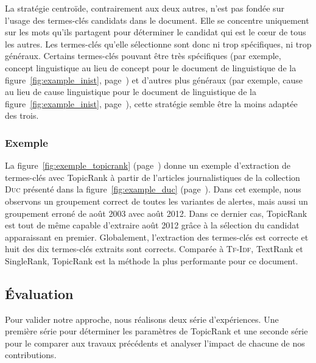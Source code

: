         La stratégie centroïde, contrairement aux deux autres, n'est pas fondée
        sur l'usage des termes-clés candidats dans le document. Elle se
        concentre uniquement sur les mots qu'ils partagent pour déterminer le
        candidat qui est le c\oe{}ur de tous les autres. Les termes-clés qu'elle
        sélectionne sont donc ni trop spécifiques, ni trop généraux. Certains
        termes-clés pouvant être très spécifiques (par exemple, \og{}concept
        linguistique\fg{} au lieu de \og{}concept\fg{} pour le document de
        linguistique de la figure~\ref{fig:example_inist},
        page~\pageref{fig:example_inist}) et d'autres plus généraux (par
        exemple, \og{}cause\fg{} au lieu de \og{}cause linguistique\fg{} pour le
        document de linguistique de la figure~\ref{fig:example_inist},
        page~\pageref{fig:example_inist}), cette stratégie semble être la moins
        adaptée des trois.

      \subsubsection{Exemple}
      \label{subsubsec:main:domain_independent_keyphrase_extraction-unsupervised_automatic_keyphrase_extraction-topicrank-example}
        La figure~\ref{fig:exemple_topicrank}
        (page~\pageref{fig:exemple_topicrank}) donne un exemple d'extraction de
        termes-clés avec TopicRank à partir de l'articles journalistiques
        de la collection \textsc{Duc} présenté dans la figure~\ref{fig:example_duc}
        (page~\pageref{fig:example_duc}). Dans cet exemple,
        nous observons un groupement correct de toutes les variantes de
        \og{}aler\-tes\fg{}, mais aussi un groupement erroné de \og{}août 2003\fg{} avec
        \og{}août 2012\fg{}. Dans ce dernier cas, TopicRank est tout de même
        capable d'extraire \og{}août 2012\fg{} grâce à la sélection du candidat
        apparaissant en premier. Globalement, l'extraction des termes-clés est
        correcte et huit des dix termes-clés extraits sont corrects. Comparée à
        \textsc{Tf-Idf}, TextRank et SingleRank, TopicRank est la méthode la
        plus performante pour ce document.
        

    \subsection{Évaluation}
    \label{subsec:main:domain_independent_keyphrase_extraction-unsupervised_automatic_keyphrase_extraction-evaluation}
      Pour valider notre approche, nous réalisons deux série d'expériences. Une
      première série pour déterminer les paramètres de TopicRank et
      une seconde série pour le comparer aux travaux précédents et analyser
      l'impact de chacune de nos contributions.
      
